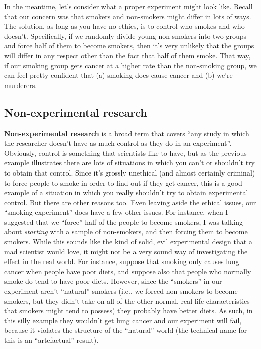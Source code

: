 \documentclass[
  a4paper,
]{book}
\begin{document}
In the meantime, let's consider what a proper experiment might look
like. Recall that our concern was that smokers and non-smokers might
differ in lots of ways. The solution, as long as you have no ethics, is
to control who smokes and who doesn't. Specifically, if we randomly
divide young non-smokers into two groups and force half of them to
become smokers, then it's very unlikely that the groups will differ in
any respect other than the fact that half of them smoke. That way, if
our smoking group gets cancer at a higher rate than the non-smoking
group, we can feel pretty confident that (a) smoking does cause cancer
and (b) we're murderers.

\subsection{Non-experimental research}\label{non-experimental-research}

\textbf{Non-experimental research} is a broad term that covers ``any
study in which the researcher doesn't have as much control as they do in
an experiment''. Obviously, control is something that scientists like to
have, but as the previous example illustrates there are lots of
situations in which you can't or shouldn't try to obtain that control.
Since it's grossly unethical (and almost certainly criminal) to force
people to smoke in order to find out if they get cancer, this is a good
example of a situation in which you really shouldn't try to obtain
experimental control. But there are other reasons too. Even leaving
aside the ethical issues, our ``smoking experiment'' does have a few
other issues. For instance, when I suggested that we ``force'' half of
the people to become smokers, I was talking about \emph{starting} with a
sample of non-smokers, and then forcing them to become smokers. While
this sounds like the kind of solid, evil experimental design that a mad
scientist would love, it might not be a very sound way of investigating
the effect in the real world. For instance, suppose that smoking only
causes lung cancer when people have poor diets, and suppose also that
people who normally smoke do tend to have poor diets. However, since the
``smokers'' in our experiment aren't ``natural'' smokers (i.e., we
forced non-smokers to become smokers, but they didn't take on all of the
other normal, real-life characteristics that smokers might tend to
possess) they probably have better diets. As such, in this silly example
they wouldn't get lung cancer and our experiment will fail, because it
violates the structure of the ``natural'' world (the technical name for
this is an ``artefactual'' result).
\end{document}
